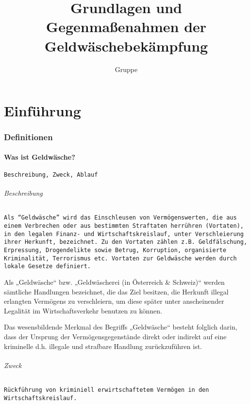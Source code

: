 \documentclass{article}
\begin{document}
\title{Grundlagen und Gegenmaßenahmen der Geldwäschebekämpfung}
\author{Gruppe}
\maketitle

\tableofcontents

\newpage

\part[Einführung]{Einführung}
    \section[Defintionen]{Definitionen}
        \subsection[Was ist Geldwäsche?]{Was ist Geldwäsche?}
            \texttt{Beschreibung, Zweck, Ablauf}
            
            \paragraph[Beschreibung]{Beschreibung}
             	\texttt{Als “Geldwäsche” wird das Einschleusen von Vermögenswerten, die aus einem Verbrechen oder aus bestimmten Straftaten herrühren (Vortaten), in den legalen Finanz- und Wirtschaftskreislauf, unter Verschleierung ihrer Herkunft, bezeichnet. Zu den Vortaten zählen z.B. Geldfälschung, Erpressung, Drogendelikte sowie Betrug, Korruption, organisierte Kriminalität, Terrorismus etc. Vortaten zur Geldwäsche werden durch lokale Gesetze definiert.}

		Als „Geldwäsche“ bzw. „Geldwäscherei (in Österreich & Schweiz)“ werden sämtliche Handlungen bezeichnet, die das Ziel besitzen, die Herkunft illegal erlangten Vermögens zu verschleiern, um diese später unter anscheinender Legalität im Wirtschaftsverkehr benutzen zu können.

		Das wesensbildende Merkmal des Begriffs „Geldwäsche“ besteht folglich darin, dass der Ursprung der Vermögensgegenstände direkt oder indirekt auf eine kriminelle d.h. illegale und strafbare Handlung zurückzuführen ist.
            
            \paragraph[Zweck]{Zweck}
            	\texttt{Rückführung von kriminiell erwirtschaftetem Vermögen in den Wirtschaftskreislauf.}
\end{document}
